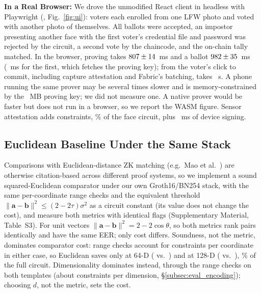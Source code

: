 \documentclass[10pt,letterpaper,journal]{IEEEtran}
\begin{document}
\textbf{In a Real Browser:} We drove the unmodified React client in headless \nBrowserName{} with Playwright (, Fig.~\ref{fig:ui}): \nBrowserVoters{} voters each enrolled from one LFW photo and voted with another photo of themselves. All ballots were accepted, an impostor presenting another face with the first voter's credential file and password was rejected by the circuit, a second vote by the chaincode, and the on-chain tally matched. In the browser, proving takes $807 \pm 14$~ms and a ballot $982 \pm 35$~ms (\nBrowserColdMs~ms for the first, which fetches the proving key); from the voter's click to commit, including capture attestation and Fabric's batching, takes \nBrowserSubmitS~s. A phone running the same prover may be several times slower and is memory-constrained by the \nKeyMB~MB proving key; we did not measure one. A native prover would be faster but does not run in a browser, so we report the WASM figure. Sensor attestation adds \nAttestConstraints{} constraints, \nAttestShare\% of the face circuit, plus \nSignMs~ms of device signing.

\subsection{Euclidean Baseline Under the Same Stack}
\label{subsec:eval_baseline}

Comparisons with Euclidean-distance ZK matching (e.g.\ Mao et al.~\cite{Mao2023}) are otherwise citation-based across different proof systems, so we implement a sound squared-Euclidean comparator under our own Groth16/BN254 stack, with the same per-coordinate range checks and the equivalent threshold $\|\mathbf{a}-\mathbf{b}\|^2 \le (2-2\tau)\sigma^2$ as a circuit constant (its value does not change the cost), and measure both metrics with identical flags (Supplementary Material, Table~S3). For unit vectors $\|\mathbf{a}-\mathbf{b}\|^2 = 2 - 2\cos\theta$, so both metrics rank pairs identically and have the same EER; only cost differs. Soundness, not the metric, dominates comparator cost: range checks account for \nRangePerCoord{} constraints per coordinate in either case, so Euclidean saves only \nEuclidSaveSixtyFour{} at 64-D (\nEuclidSixtyFour{} vs.\ \nCosSixtyFour) and \nEuclidSave{} at 128-D (\nEuclidConstraints{} vs.\ \nCosConstraints), \nEuclidSaveShare\% of the full circuit. Dimensionality dominates instead, through the range checks on both templates (about \nPerDim{} constraints per dimension, \S\ref{subsec:eval_encoding}); choosing $d$, not the metric, sets the cost.
\end{document}
